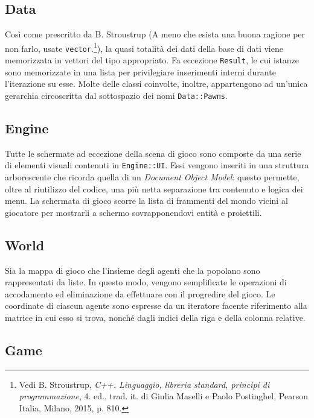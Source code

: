 \documentclass[a4paper]{article}
\begin{document}
\subsection{Data}

Così come prescritto da B. Stroustrup (\guillemotleft A meno che esista una buona ragione per
non farlo, usate \verb!vector!.\guillemotright\footnote{\label{note1} Vedi B.
Stroustrup, \emph{C++. Linguaggio, libreria standard, principi di
programmazione}, 4. ed., trad. it. di Giulia Maselli e Paolo Postinghel, Pearson
Italia, Milano, 2015, p. 810.}), la quasi totalità dei dati della base di
dati viene memorizzata in vettori del tipo appropriato. Fa eccezione
\verb!Result!, le cui istanze sono memorizzate in una lista per privilegiare
inserimenti interni durante l'iterazione su esse. Molte delle classi coinvolte,
inoltre, appartengono ad un'unica gerarchia circoscritta dal sottospazio dei
nomi \verb!Data::Pawns!.

\subsection{Engine}

Tutte le schermate ad eccezione della scena di gioco sono composte da una serie
di elementi visuali contenuti in \verb!Engine::UI!. Essi vengono inseriti in una
struttura arborescente che ricorda quella di un \emph{Document Object Model}:
questo permette, oltre al riutilizzo del codice, una più netta separazione tra
contenuto e logica dei menu.
La schermata di gioco scorre la lista di frammenti del mondo vicini al giocatore
per mostrarli a schermo sovrapponendovi entit\`a e proiettili.

\subsection{World}

Sia la mappa di gioco che l'insieme degli agenti che la popolano sono
rappresentati da liste. In questo modo, vengono semplificate le operazioni di
accodamento ed eliminazione da effettuare con il progredire del gioco. Le
coordinate di ciascun agente sono espresse da un iteratore facente riferimento
alla matrice in cui esso si trova, nonch\'e dagli indici della riga e della
colonna relative.

\subsection{Game}
\end{document}
